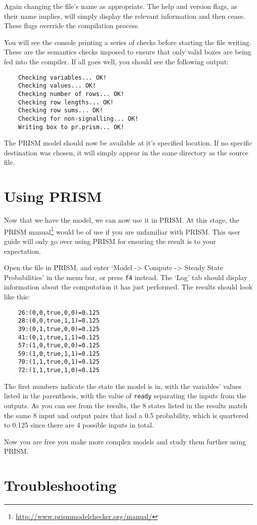 \documentclass[report.tex]{subfiles}
\begin{document}
Again changing the file's name as appropriate. The help and version flags, as
their name implies, will simply display the relevant information and then cease.
These flags override the compilation process.

You will see the console printing a series of checks before starting the file
writing. These are the semantics checks imposed to ensure that only valid
boxes are being fed into the compiler. If all goes well, you should see the
following output:

\begin{lstlisting}
    Checking variables... OK!
    Checking values... OK!
    Checking number of rows... OK!
    Checking row lengths... OK!
    Checking row sums... OK!
    Checking for non-signalling... OK!
    Writing box to pr.prism... OK!
\end{lstlisting}

The PRISM model should now be available at it's specified location. If no
specific destination was chosen, it will simply appear in the same directory as
the source file.

\section{Using PRISM} %
\label{sec:using_prism}
Now that we have the model, we can now use it in PRISM. At this stage, the PRISM
manual\footnote{\url{http://www.prismmodelchecker.org/manual/}} would be of use
if you are unfamiliar with PRISM. This user guide will only go over using PRISM
for ensuring the result is to your expectation.

Open the file in PRISM, and enter `Model -> Compute -> Steady State
Probabilities' in the menu bar, or press \texttt{f4} instead. The `Log' tab
should display information about the computation it has just performed. The
results should look like this:

\begin{lstlisting}
    26:(0,0,true,0,0)=0.125
    28:(0,0,true,1,1)=0.125
    39:(0,1,true,0,0)=0.125
    41:(0,1,true,1,1)=0.125
    57:(1,0,true,0,0)=0.125
    59:(1,0,true,1,1)=0.125
    70:(1,1,true,0,1)=0.125
    72:(1,1,true,1,0)=0.125
\end{lstlisting}

The first numbers indicate the state the model is in, with the variables'
values listed in the parenthesis, with the value of \texttt{ready} separating
the inputs from the outputs. As you can see from the results, the 8 states
listed in the results match the same 8 input and output pairs that had a 0.5
probability, which is quartered to 0.125 since there are 4 possible inputs in
total.

Now you are free you make more complex models and study them further using
PRISM.

\section{Troubleshooting} %
\label{sec:troubleshooting}


\newpage
\end{document}
